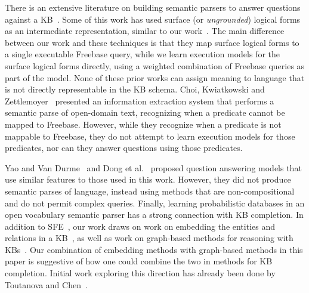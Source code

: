 \documentclass[11pt,letterpaper]{article}
\begin{document}
There is an extensive literature on building semantic parsers to answer questions against a
KB~\cite{zettlemoyer-2005-ccg,berant-2013-semantic-parsing-qa,%
krishnamurthy-2012-semantic-parsing,li-2015-semantic-parsing-scfg}.  Some of this work has used
surface (or \emph{ungrounded}) logical forms as an intermediate representation, similar to our
work~\cite{kwiatkowski-2013-ontology-matching,reddy-2014-graph-matching,%
yih-2015-semparse-query-graph,reddy-2016-dep-lambda}.  The main difference between our work and
these techniques is that they map surface logical forms to a single executable Freebase query,
while we learn execution models for the surface logical forms directly, using a weighted
combination of Freebase queries as part of the model.  None of these prior works can assign meaning
to language that is not directly representable in the KB schema.  Choi, Kwiatkowski and Zettlemoyer~
presented an information extraction system that performs a semantic parse of open-domain text,
recognizing when a predicate cannot be mapped to Freebase.  However, while they recognize when a
predicate is not mappable to Freebase, they do not attempt to learn execution models for those
predicates, nor can they answer questions using those predicates.

Yao and Van Durme~ and Dong et
al.~ proposed question answering models that use similar
features to those used in this work.  However, they did not produce semantic parses of language,
instead using methods that are non-compositional and do not permit complex queries.  Finally, learning probabilistic databases in an open vocabulary semantic parser has a strong
connection with KB completion.  In addition to SFE~\cite{gardner-2015-sfe}, our work draws on work
on embedding the entities and relations in a
KB~\cite{riedel-2013-mf-universal-schema,nickel-2011-rescal,%
bordes-2013-transe,nickel-2014-are,toutanova-2015-joint-text-kb-embedding}, as well as work on
graph-based methods for reasoning with
KBs~\cite{lao-2010-original-pra,gardner-2014-vector-space-pra,neelakantan-2015-rnn-kbc,%
bornea-2015-relational-path-mining}.  Our combination of embedding methods with graph-based methods
in this paper is suggestive of how one could combine the two in methods for KB completion.  Initial
work exploring this direction has already been done by Toutanova and
Chen~.


\vspace{-0.85mm}
\vspace{-1.54mm}
\end{document}

